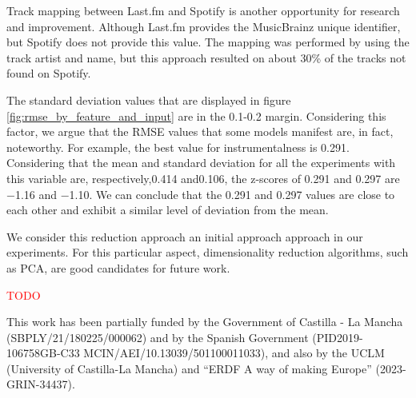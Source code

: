 \documentclass[sn-mathphys]{sn-jnl}%
\theoremstyle{thmstyleone}%
\theoremstyle{thmstyletwo}%
\theoremstyle{thmstylethree}%
\begin{document}
Track mapping between Last.fm and Spotify is another opportunity for research and improvement.
Although Last.fm provides the MusicBrainz unique identifier, but Spotify does not provide this value.
The mapping was performed by using the track artist and name, but this approach resulted on about 30\% of the tracks not found on Spotify.

The standard deviation values that are displayed in figure \ref{fig:rmse_by_feature_and_input} are in the 0.1-0.2 margin.
Considering this factor, we argue that the RMSE values that some models manifest are, in fact, noteworthy.
For example, the best value for instrumentalness is \num{0.291}.
Considering that the mean and standard deviation for all the experiments with this variable are, respectively,\num{0.414} and\num{0.106}, the z-scores
of \num{0.291} and \num{0.297} are \num{-1.16} and \num{-1.10}.
We can conclude that the \num{0.291} and \num{0.297} values are close to each other and exhibit a similar level of deviation from the mean.

We consider this reduction approach an initial approach approach in our experiments.
For this particular aspect, dimensionality reduction algorithms, such as PCA, are good candidates for future work.


\textcolor{red}{TODO}


\backmatter


This work has been partially funded by the Government of Castilla - La Mancha (SBPLY/21/180225/000062) and by the Spanish Government (PID2019-106758GB-C33 MCIN/AEI/10.13039/501100011033), and also by the UCLM (University of Castilla-La Mancha) and “ERDF A way of making Europe” (2023-GRIN-34437).





\end{document}
